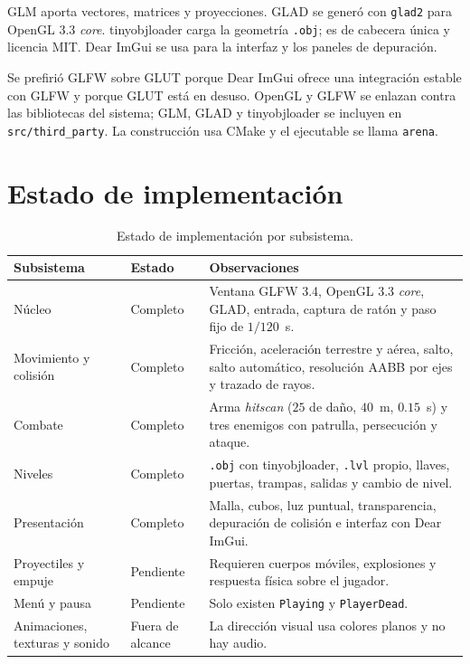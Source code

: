 \documentclass[12pt,a4paper]{article}
\begin{document}
GLM aporta vectores, matrices y proyecciones. GLAD se generó con \texttt{glad2}
para OpenGL 3.3 \emph{core}. tinyobjloader carga la geometría \texttt{.obj}; es
de cabecera única y licencia MIT. Dear ImGui se usa para la interfaz y los
paneles de depuración.

Se prefirió GLFW sobre GLUT porque Dear ImGui ofrece una integración estable con
GLFW y porque GLUT está en desuso. OpenGL y GLFW se enlazan contra las
bibliotecas del sistema; GLM, GLAD y tinyobjloader se incluyen en
\texttt{src/third\_party}. La construcción usa CMake y el ejecutable se llama
\texttt{arena}.

\section{Estado de implementación}

\begin{table}[H]
  \centering
  \footnotesize
  \renewcommand{\arraystretch}{1.05}
  \begin{tabular}{@{}>{\raggedright\arraybackslash}p{}>{\raggedright\arraybackslash}p{}>{\raggedright\arraybackslash}p{}@{}}
    \toprule
    Subsistema & Estado & Observaciones \\
    \midrule
    Núcleo & Completo &
      Ventana GLFW 3.4, OpenGL 3.3 \emph{core}, GLAD, entrada, captura de ratón
      y paso fijo de $1/120$~s. \\
    Movimiento y colisión & Completo &
      Fricción, aceleración terrestre y aérea, salto, salto automático,
      resolución AABB por ejes y trazado de rayos. \\
    Combate & Completo &
      Arma \emph{hitscan} ($25$ de daño, $40$~m, $0.15$~s) y tres enemigos con
      patrulla, persecución y ataque. \\
    Niveles & Completo &
      \texttt{.obj} con tinyobjloader, \texttt{.lvl} propio, llaves, puertas,
      trampas, salidas y cambio de nivel. \\
    Presentación & Completo &
      Malla, cubos, luz puntual, transparencia, depuración de colisión e
      interfaz con Dear ImGui. \\
    Proyectiles y empuje & Pendiente &
      Requieren cuerpos móviles, explosiones y respuesta física sobre el
      jugador. \\
    Menú y pausa & Pendiente &
      Solo existen \texttt{Playing} y \texttt{PlayerDead}. \\
    Animaciones, texturas y sonido & Fuera de alcance &
      La dirección visual usa colores planos y no hay audio. \\
    \bottomrule
  \end{tabular}
  \caption{Estado de implementación por subsistema.}
  \label{tab:estado}
\end{table}
\end{document}
